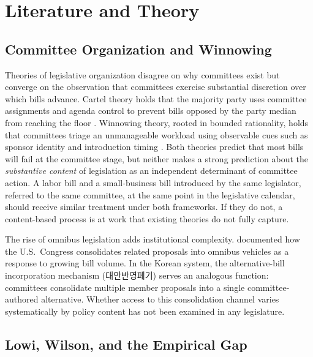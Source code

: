 \documentclass[11pt]{article}
\begin{document}

\section{Literature and Theory}
\label{sec:lit}

\subsection{Committee Organization and Winnowing}

Theories of legislative organization disagree on why committees exist but converge on the observation that committees exercise substantial discretion over which bills advance. Cartel theory holds that the majority party uses committee assignments and agenda control to prevent bills opposed by the party median from reaching the floor \citep{cox2005}. Winnowing theory, rooted in bounded rationality, holds that committees triage an unmanageable workload using observable cues such as sponsor identity and introduction timing \citep{krutz2005}. Both theories predict that most bills will fail at the committee stage, but neither makes a strong prediction about the \emph{substantive content} of legislation as an independent determinant of committee action. A labor bill and a small-business bill introduced by the same legislator, referred to the same committee, at the same point in the legislative calendar, should receive similar treatment under both frameworks. If they do not, a content-based process is at work that existing theories do not fully capture.

The rise of omnibus legislation adds institutional complexity. \citet{krutz2005} documented how the U.S.\ Congress consolidates related proposals into omnibus vehicles as a response to growing bill volume. In the Korean system, the alternative-bill incorporation mechanism (대안반영폐기) serves an analogous function: committees consolidate multiple member proposals into a single committee-authored alternative. Whether access to this consolidation channel varies systematically by policy content has not been examined in any legislature.

\subsection{Lowi, Wilson, and the Empirical Gap}
\end{document}
